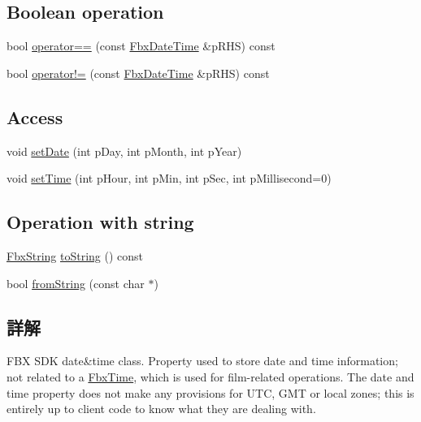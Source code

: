 \subsection*{Boolean operation}
\begin{DoxyCompactItemize}
\item 
bool \hyperlink{class_fbx_date_time_a881645b54b976cf8021a716b3046da96}{operator==} (const \hyperlink{class_fbx_date_time}{Fbx\+Date\+Time} \&p\+R\+HS) const
\item 
bool \hyperlink{class_fbx_date_time_a525927fe563bd071b4d4a1a45e1eb251}{operator!=} (const \hyperlink{class_fbx_date_time}{Fbx\+Date\+Time} \&p\+R\+HS) const
\end{DoxyCompactItemize}
\subsection*{Access}
\begin{DoxyCompactItemize}
\item 
void \hyperlink{class_fbx_date_time_a9ba087e7990d6cf6b3d004bfa2130f01}{set\+Date} (int p\+Day, int p\+Month, int p\+Year)
\item 
void \hyperlink{class_fbx_date_time_a6c5353f99f32b23cdf9b9823b476c423}{set\+Time} (int p\+Hour, int p\+Min, int p\+Sec, int p\+Millisecond=0)
\end{DoxyCompactItemize}
\subsection*{Operation with string}
\begin{DoxyCompactItemize}
\item 
\hyperlink{class_fbx_string}{Fbx\+String} \hyperlink{class_fbx_date_time_a283a6c2397087698e188e421a4dc665d}{to\+String} () const
\item 
bool \hyperlink{class_fbx_date_time_ad1139b0ea8be739b38956076c5bfd367}{from\+String} (const char $\ast$)
\end{DoxyCompactItemize}


\subsection{詳解}
F\+BX S\+DK date\&time class. Property used to store date and time information; not related to a \hyperlink{class_fbx_time}{Fbx\+Time}, which is used for film-\/related operations. The date and time property does not make any provisions for U\+TC, G\+MT or local zones; this is entirely up to client code to know what they are dealing with. 

